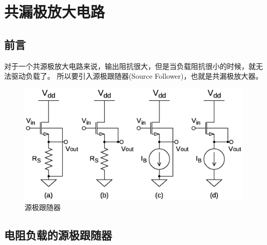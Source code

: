 \documentclass[twoside,a4paper,openright,titlepage,draft]{ctexrep}
\begin{document}
\section{共漏极放大电路}

\subsection{前言}
\par
对于一个共源极放大电路来说，输出阻抗很大，但是当负载阻抗很小的时候，就无法驱动负载了。
所以要引入源极跟随器(Source Follower)，也就是共漏极放大器。\\

\begin{figure}[H]
    \centering
    \includegraphics[width=\textwidth]{sourcefollower.eps}
    \caption{源极跟随器}
    \label{fig:源极跟随器}
\end{figure}

\subsection{电阻负载的源极跟随器}
\end{document}

